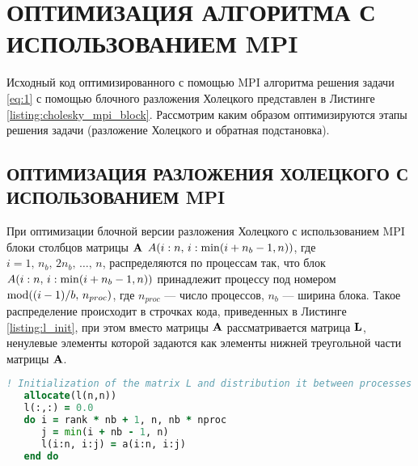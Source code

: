 \section{ОПТИМИЗАЦИЯ АЛГОРИТМА С ИСПОЛЬЗОВАНИЕМ MPI}

Исходный код оптимизированного с помощью MPI алгоритма решения задачи \eqref{eq:1} с помощью блочного разложения Холецкого представлен в Листинге \ref{listing:cholesky_mpi_block}. Рассмотрим каким образом оптимизируются этапы решения задачи (разложение Холецкого и обратная подстановка).

\subsection{ОПТИМИЗАЦИЯ РАЗЛОЖЕНИЯ ХОЛЕЦКОГО С ИСПОЛЬЗОВАНИЕМ MPI}

При оптимизации блочной версии разложения Холецкого с использованием MPI блоки столбцов матрицы $\vb{A}$ ${A}\qty(i:n,\,i:\min(i+n_b-1,n))$, где $i=1,\, n_b,\, 2n_b,\, \ldots,\, n$, распределяются по процессам так, что блок ${A}\qty(i:n,\,i:\min(i+n_b-1,n))$ принадлежит процессу под номером $\mathrm{mod}\qty((i-1)/b,\, n_{proc})$, где $n_{proc}$ --- число процессов, $n_b$ --- ширина блока. Такое распределение происходит в строчках кода, приведенных в Листинге \ref{listing:l_init}, при этом вместо матрицы $\vb{A}$ рассматривается матрица $\vb{L}$, ненулевые элементы которой задаются как элементы нижней треугольной части матрицы $\vb{A}$.
\begin{lstlisting}[language=fortran, style=fortran, label={listing:l_init}, caption={Инициализация и распределение блоков столбцов матрицы $\vb{L}$ по процессам. Ненулевые блоки матрицы $\vb{L}$ задаются как блоки нижней треугольной части матрицы $\vb{A}$.}]
   ! Initialization of the matrix L and distribution it between processes
   allocate(l(n,n))
   l(:,:) = 0.0
   do i = rank * nb + 1, n, nb * nproc
      j = min(i + nb - 1, n)
      l(i:n, i:j) = a(i:n, i:j)
   end do
\end{lstlisting}

